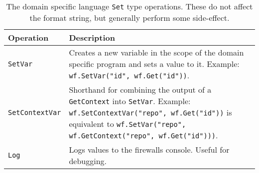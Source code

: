 \begin{table}[h]
\centering

\begin{tabular}{ m{2.5cm} m{11.5cm}  } 
 \hline
 Operation & Description \\ 
 \hline \hline

 \lstinline|SetVar| & Creates a new variable in the scope of the domain specific program and sets a value to it. \newline Example: \lstinline|wf.SetVar("id", wf.Get("id"))|. \\ \hline

 \lstinline|SetContextVar| & Shorthand for combining the output of a \lstinline|GetContext| into \lstinline|SetVar|. \newline Example: \lstinline|wf.SetContextVar("repo", wf.Get("id"))| is equivalent to \lstinline|wf.SetVar("repo", wf.GetContext("repo", wf.Get("id")))|. \\ \hline

 \lstinline|Log| & Logs values to the firewalls console. Useful for debugging. \\ \hline

\end{tabular}
\caption{The domain specific language \lstinline{Set} type operations. These do not affect the format string, but generally perform some side-effect.}
\label{Table:DSL_SetterOperations}
\end{table}






